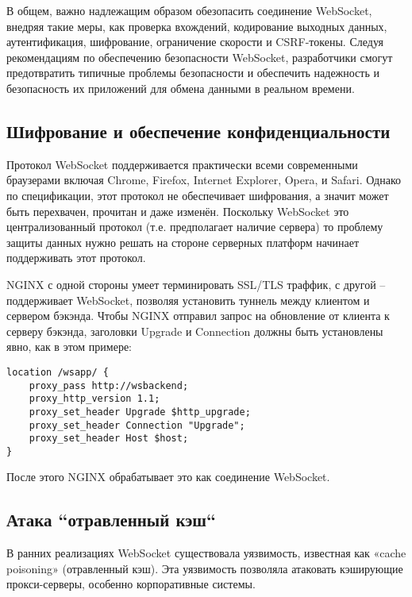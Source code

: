 В общем, важно надлежащим образом обезопасить соединение WebSocket, внедряя такие меры, как проверка вхождений, кодирование выходных данных, аутентификация, шифрование, ограничение скорости и CSRF-токены. Следуя рекомендациям по обеспечению безопасности WebSocket, разработчики смогут предотвратить типичные проблемы безопасности и обеспечить надежность и безопасность их приложений для обмена данными в реальном времени.

\subsection{Шифрование и обеспечение конфиденциальности}

Протокол WebSocket поддерживается практически всеми современными браузерами включая Chrome, Firefox, Internet Explorer, Opera, и Safari. Однако по спецификации, этот протокол не обеспечивает шифрования, а значит может быть перехвачен, прочитан и даже изменён. Поскольку WebSocket это централизованный протокол (т.е. предполагает наличие сервера) то проблему защиты данных нужно решать на стороне серверных платформ начинает поддерживать этот протокол.

NGINX с одной стороны умеет терминировать SSL/TLS траффик, с другой -- поддерживает WebSocket, позволяя установить туннель между клиентом и сервером бэкэнда\cite{label4}. Чтобы NGINX отправил запрос на обновление от клиента к серверу бэкэнда, заголовки Upgrade и Connection должны быть установлены явно, как в этом примере:

\begin{lstlisting}[style=CommandLineStyle]
location /wsapp/ {
    proxy_pass http://wsbackend;
    proxy_http_version 1.1;
    proxy_set_header Upgrade $http_upgrade;
    proxy_set_header Connection "Upgrade";
    proxy_set_header Host $host;
}
\end{lstlisting}

После этого NGINX обрабатывает это как соединение WebSocket.

\subsection{Атака ``отравленный кэш``}

В ранних реализациях WebSocket существовала уязвимость, известная как «cache poisoning» (отравленный кэш)\cite{label1}. Эта уязвимость позволяла атаковать кэширующие прокси-серверы, особенно корпоративные системы.

